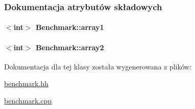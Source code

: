 \subsubsection{Dokumentacja atrybutów składowych}
\hypertarget{class_benchmark_ae960752c05b37c7361586bbf8c11c210}{
\paragraph[{array1}]{$<$int$>$ Benchmark\-::array1\hspace{0.3cm}{\ttfamily [private]}}}\label{class_benchmark_ae960752c05b37c7361586bbf8c11c210}
\hypertarget{class_benchmark_a7b077c3084f2d60804b0673860dae5b0}{
\paragraph[{array2}]{$<$int$>$ Benchmark\-::array2\hspace{0.3cm}{\ttfamily [private]}}}\label{class_benchmark_a7b077c3084f2d60804b0673860dae5b0}


Dokumentacja dla tej klasy została wygenerowana z plików\-:\begin{DoxyCompactItemize}
\item 
\hyperlink{benchmark_8hh}{benchmark.\-hh}\item 
\hyperlink{benchmark_8cpp}{benchmark.\-cpp}\end{DoxyCompactItemize}
